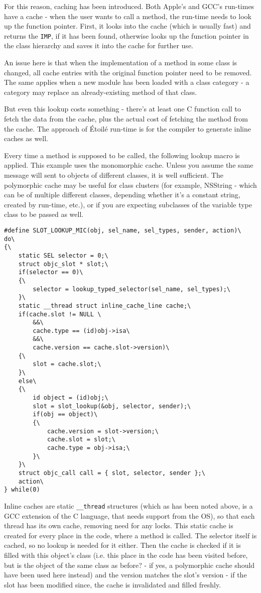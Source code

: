 For this reason, caching has been introduced. Both Apple's and GCC's run-times have a cache - when the user wants to call a method, the run-time needs to look up the function pointer. First, it looks into the cache (which is usually fast) and returns the \verb=IMP=, if it has been found, otherwise looks up the function pointer in the class hierarchy and saves it into the cache for further use.

An issue here is that when the implementation of a method in some class is changed, all cache entries with the original function pointer need to be removed. The same applies when a new module has been loaded with a class category - a category may replace an already-existing method of that class.

But even this lookup costs something - there's at least one C function call to fetch the data from the cache, plus the actual cost of fetching the method from the cache. The approach of \'Etoil\'e run-time is for the compiler to generate inline caches as well.

Every time a method is supposed to be called, the following lookup macro is applied. This example uses the monomorphic cache. Unless you assume the same message will sent to objects of different classes, it is well sufficient. The polymorphic cache may be useful for class clusters (for example, NSString - which can be of multiple different classes, depending whether it's a constant string, created by run-time, etc.), or if you are expecting subclasses of the variable type class to be passed as well.

\begin{verbatim}
#define SLOT_LOOKUP_MIC(obj, sel_name, sel_types, sender, action)\
do\
{\
    static SEL selector = 0;\
    struct objc_slot * slot;\
    if(selector == 0)\
    {\
        selector = lookup_typed_selector(sel_name, sel_types);\
    }\
    static __thread struct inline_cache_line cache;\
    if(cache.slot != NULL \
        &&\
        cache.type == (id)obj->isa\
        &&\
        cache.version == cache.slot->version)\
    {\
        slot = cache.slot;\
    }\
    else\
    {\
        id object = (id)obj;\
        slot = slot_lookup(&obj, selector, sender);\
        if(obj == object)\
        {\
            cache.version = slot->version;\
            cache.slot = slot;\
            cache.type = obj->isa;\
        }\
    }\
    struct objc_call call = { slot, selector, sender };\
    action\
} while(0)
\end{verbatim}


Inline caches are static \verb=__thread= structures (which as has been noted above, is a GCC extension of the C language, that needs support from the OS), so that each thread has its own cache, removing need for any locks. This static cache is created for every place in the code, where a method is called. The selector itself is cached, so no lookup is needed for it either. Then the cache is checked if it is filled with this object's class (i.e. this place in the code has been visited before, but is the object of the same class as before? - if yes, a polymorphic cache should have been used here instead) and the version matches the slot's version - if the slot has been modified since, the cache is invalidated and filled freshly.

